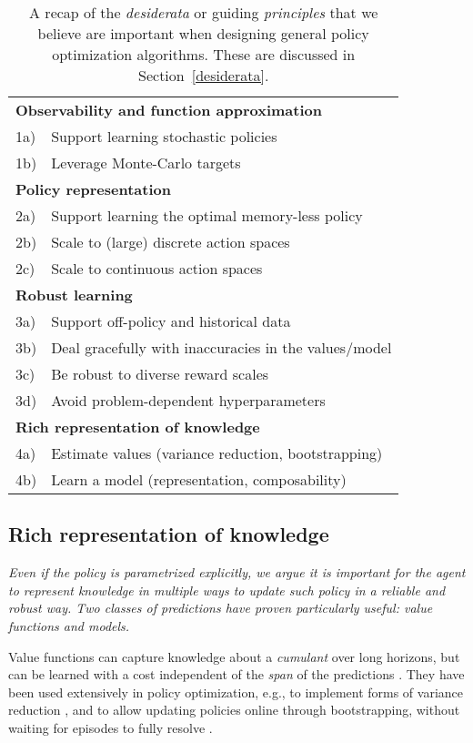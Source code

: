 \documentclass{article}
\begin{document}
\begin{table}[t]
\centering
\vskip 0.15in
\small{
\begin{tabular}{ l | l}
\multicolumn{2}{l}{\textbf{Observability and function approximation}} \\
1a) & Support learning stochastic policies \\
1b) & Leverage Monte-Carlo targets \\
\multicolumn{2}{l}{\textbf{Policy representation}} \\
2a) & Support learning the optimal memory-less policy \\
2b) & Scale to (large) discrete action spaces \\
2c) & Scale to continuous action spaces \\
\multicolumn{2}{l}{\textbf{Robust learning}} \\
3a) & Support off-policy and historical data \\
3b) & Deal gracefully with inaccuracies in the values/model \\
3c) & Be robust to diverse reward scales \\
3d) & Avoid problem-dependent hyperparameters \\
\multicolumn{2}{l}{\textbf{Rich representation of knowledge}} \\
4a) & Estimate values (variance reduction, bootstrapping) \\
4b) & Learn a model (representation, composability) \\
\end{tabular}}
\caption{A recap of the \emph{desiderata} or guiding \emph{principles} that we believe are important when designing general policy optimization algorithms. These are discussed in Section~\ref{desiderata}.}
\vskip -0.14in
\label{table-desiderata}
\end{table}

\subsection{Rich representation of knowledge}
\label{sec:model_benefits}
\textit{Even if the policy is parametrized explicitly, we argue it is important for the agent to represent knowledge in multiple ways \citep{degris2012knowledge} to update such policy in a reliable and robust way. Two classes of predictions have proven particularly useful: value functions and models.}

Value functions \cite{sutton1988,sutton2011horde} can capture knowledge about a \textit{cumulant} over long horizons, but can be learned with a cost independent of the \emph{span} of the predictions \citep{vanHasselt2015span}. They have been used extensively in policy optimization, e.g., to implement forms of variance reduction \cite{williams1992}, and to allow updating policies online through bootstrapping, without waiting for episodes to fully resolve \citep{sutton2000}.
\end{document}
